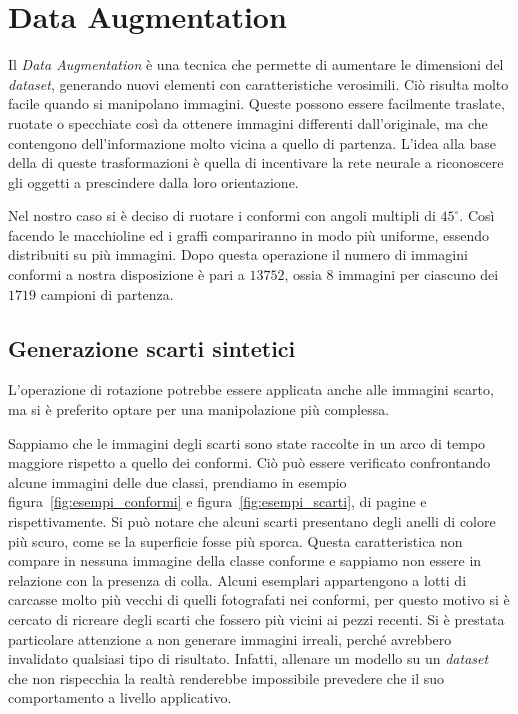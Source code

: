 
\clearpage
\section {Data Augmentation}
Il \textit{Data Augmentation} è una tecnica che permette di aumentare le dimensioni del \textit{dataset}, generando nuovi elementi con caratteristiche verosimili.
Ciò risulta molto facile quando si manipolano immagini.
Queste possono essere facilmente traslate, ruotate o specchiate così da ottenere immagini differenti dall'originale, ma che contengono dell'informazione molto vicina a quello di partenza.
L'idea alla base della di queste trasformazioni è quella di incentivare la rete neurale a riconoscere gli oggetti a prescindere dalla loro orientazione.

Nel nostro caso si è deciso di ruotare i conformi con angoli multipli di $45^\circ$.
Così facendo le macchioline ed i graffi compariranno in modo più uniforme, essendo distribuiti su più immagini.
Dopo questa operazione il numero di immagini conformi a nostra disposizione è pari a $13752$, ossia $8$ immagini per ciascuno dei $1719$ campioni di partenza.

\subsection {Generazione scarti sintetici}
L'operazione di rotazione potrebbe essere applicata anche alle immagini scarto, ma si è preferito optare per una manipolazione più complessa.

Sappiamo che le immagini degli scarti sono state raccolte in un arco di tempo maggiore rispetto a quello dei conformi.
Ciò può essere verificato confrontando alcune immagini delle due classi, prendiamo in esempio figura~\ref{fig:esempi_conformi} e figura~\ref{fig:esempi_scarti}, di pagine \pageref{fig:esempi_conformi} e \pageref{fig:esempi_scarti} rispettivamente.
Si può notare che alcuni scarti presentano degli anelli di colore più scuro, come se la superficie fosse più sporca.
Questa caratteristica non compare in nessuna immagine della classe conforme e sappiamo non essere in relazione con la presenza di colla.
Alcuni esemplari appartengono a lotti di carcasse molto più vecchi di quelli fotografati nei conformi, per questo motivo si è cercato di ricreare degli scarti che fossero più vicini ai pezzi recenti.
Si è prestata particolare attenzione a non generare immagini irreali, perché avrebbero invalidato qualsiasi tipo di risultato.
Infatti, allenare un modello su un \textit{dataset} che non rispecchia la realtà renderebbe impossibile prevedere che il suo comportamento a livello applicativo.

